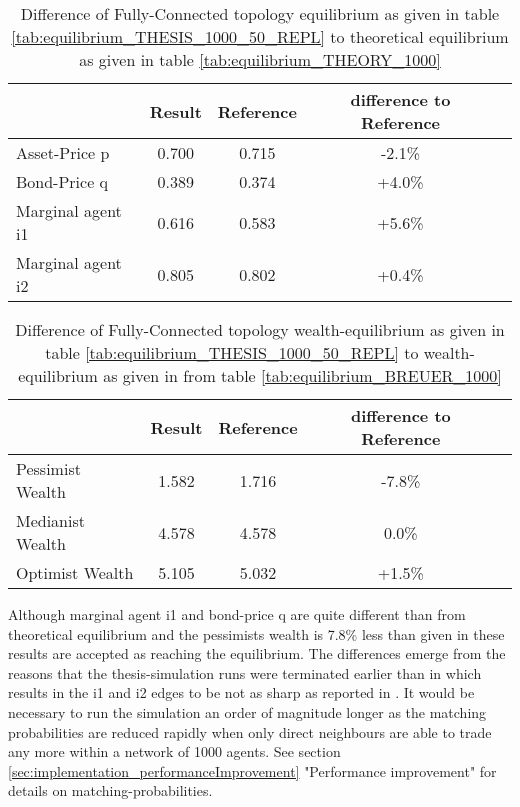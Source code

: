\documentclass[Bachelorarbeit.tex]{subfiles}
\begin{document}
\begin{table}[H]
	\caption{Difference of Fully-Connected topology equilibrium as given in table \ref{tab:equilibrium_THESIS_1000_50_REPL} to theoretical equilibrium as given in table \ref{tab:equilibrium_THEORY_1000}}
	\centering
	\begin{tabular} { l c c c r }
		& Result & Reference & difference to Reference \\
		\hline
		Asset-Price p & 0.700 & 0.715 & -2.1\% \\
		Bond-Price q & 0.389 & 0.374 & +4.0\% \\
		Marginal agent i1 & 0.616  & 0.583 & +5.6\% \\
		Marginal agent i2 & 0.805 & 0.802 & +0.4\% \\
		\hline
	\end{tabular}
\end{table} 

\begin{table}[H]
	\caption{Difference of Fully-Connected topology wealth-equilibrium as given in table \ref{tab:equilibrium_THESIS_1000_50_REPL} to wealth-equilibrium as given in \cite{Breuer2015} from table \ref{tab:equilibrium_BREUER_1000}}
	\centering
	\begin{tabular} { l c c c r }
		& Result & Reference & difference to Reference \\
		\hline
		Pessimist Wealth  & 1.582 & 1.716 & -7.8\% \\
		Medianist Wealth & 4.578 & 4.578 & 0.0\% \\
		Optimist Wealth & 5.105 & 5.032 & +1.5\% \\
		\hline
	\end{tabular}
\end{table} 

Although marginal agent i1 and bond-price q are quite different than from theoretical equilibrium and the pessimists wealth is 7.8\% less than given in \cite{Breuer2015} these results are accepted as reaching the equilibrium. The differences emerge from the reasons that the thesis-simulation runs were terminated earlier than in \cite{Breuer2015} which results in the i1 and i2 edges to be not as sharp as reported in \cite{Breuer2015}. It would be necessary to run the simulation an order of magnitude longer as the matching probabilities are reduced rapidly when only direct neighbours are able to trade any more within a network of 1000 agents. See section \ref{sec:implementation_performanceImprovement} "Performance improvement" for details on matching-probabilities.
\end{document}
